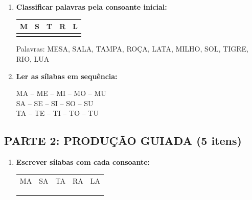 \begin{exercicio}
\begin{enumerate}
  \item \textbf{Classificar palavras pela consoante inicial:}
  \begin{center}
  \begin{tabular}{|c|c|c|c|c|}
  \hline
  M & S & T & R & L \\
  \hline
  \underline{\hspace{2cm}} & \underline{\hspace{2cm}} & \underline{\hspace{2cm}} & \underline{\hspace{2cm}} & \underline{\hspace{2cm}} \\
  \hline
  \end{tabular}
  \end{center}
  Palavras: MESA, SALA, TAMPA, ROÇA, LATA, MILHO, SOL, TIGRE, RIO, LUA

  \item \textbf{Ler as sílabas em sequência:}
  \begin{center}
  MA -- ME -- MI -- MO -- MU \\
  SA -- SE -- SI -- SO -- SU \\
  TA -- TE -- TI -- TO -- TU
  \end{center}
\end{enumerate}

\subsection*{PARTE 2: PRODUÇÃO GUIADA (5 itens)}

\begin{enumerate}[resume]
  \item \textbf{Escrever sílabas com cada consoante:}
  \begin{center}
  \begin{tabular}{ccccc}
  MA & SA & TA & RA & LA \\
  \underline{\hspace{1cm}} & \underline{\hspace{1cm}} & \underline{\hspace{1cm}} & \underline{\hspace{1cm}} & \underline{\hspace{1cm}} \\
  \underline{\hspace{1cm}} & \underline{\hspace{1cm}} & \underline{\hspace{1cm}} & \underline{\hspace{1cm}} & \underline{\hspace{1cm}} \\
  \underline{\hspace{1cm}} & \underline{\hspace{1cm}} & \underline{\hspace{1cm}} & \underline{\hspace{1cm}} & \underline{\hspace{1cm}}
  \end{tabular}
  \end{center}


\end{enumerate}
\end{exercicio}
